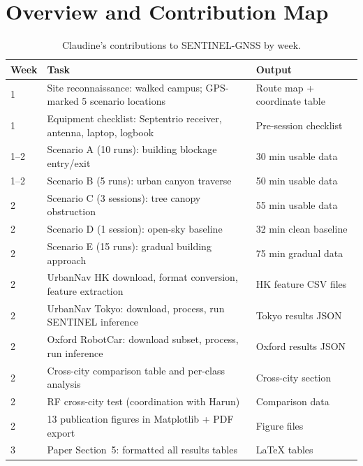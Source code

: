 \documentclass[12pt,a4paper]{article}
\begin{document}
\newpage
\tableofcontents
\newpage

\section{Overview and Contribution Map}

\begin{table}[H]
  \centering
  \caption{Claudine's contributions to SENTINEL-GNSS by week.}
  \begin{tabularx}{\textwidth}{lXl}
    \toprule
    \textbf{Week} & \textbf{Task} & \textbf{Output} \\
    \midrule
    1 & Site reconnaissance: walked campus; GPS-marked 5 scenario locations &
        Route map + coordinate table \\
    1 & Equipment checklist: Septentrio receiver, antenna, laptop, logbook &
        Pre-session checklist \\
    1--2 & Scenario A (10 runs): building blockage entry/exit &
        30 min usable data \\
    1--2 & Scenario B (5 runs): urban canyon traverse &
        50 min usable data \\
    2 & Scenario C (3 sessions): tree canopy obstruction &
        55 min usable data \\
    2 & Scenario D (1 session): open-sky baseline &
        32 min clean baseline \\
    2 & Scenario E (15 runs): gradual building approach &
        75 min gradual data \\
    2 & UrbanNav HK download, format conversion, feature extraction &
        HK feature CSV files \\
    2 & UrbanNav Tokyo: download, process, run SENTINEL inference &
        Tokyo results JSON \\
    2 & Oxford RobotCar: download subset, process, run inference &
        Oxford results JSON \\
    2 & Cross-city comparison table and per-class analysis &
        Cross-city section \\
    2 & RF cross-city test (coordination with Harun) &
        Comparison data \\
    2 & 13 publication figures in Matplotlib + PDF export &
        Figure files \\
    3 & Paper Section~5: formatted all results tables &
        LaTeX tables \\
    \bottomrule
  \end{tabularx}
\end{table}
\end{document}
